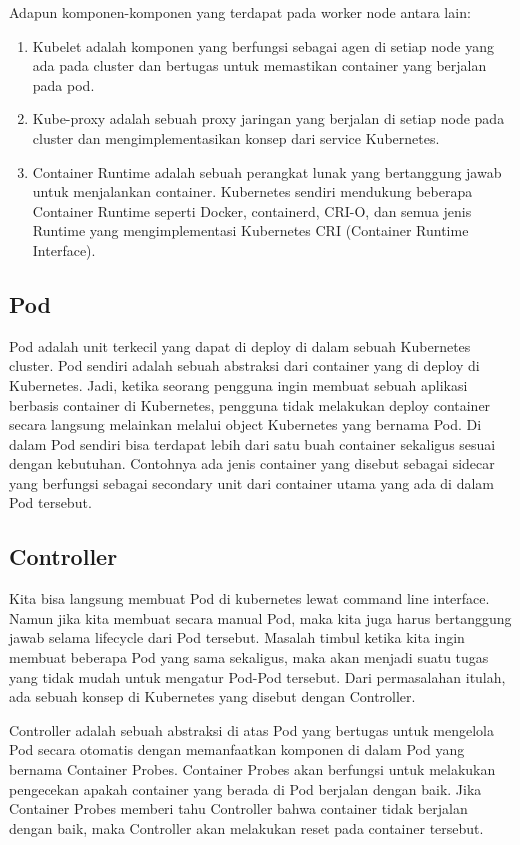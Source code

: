 Adapun komponen-komponen yang terdapat pada worker node antara lain:
\begin{enumerate}
      \item  Kubelet adalah komponen yang berfungsi sebagai agen di setiap node yang ada pada cluster dan bertugas untuk memastikan container yang berjalan pada pod.
      \item Kube-proxy adalah sebuah proxy jaringan yang berjalan di setiap node pada cluster dan mengimplementasikan konsep dari service Kubernetes.
      \item Container Runtime adalah sebuah perangkat lunak yang bertanggung jawab untuk menjalankan container. Kubernetes sendiri mendukung beberapa Container Runtime seperti Docker, containerd, CRI-O, dan semua jenis Runtime yang mengimplementasi Kubernetes CRI (Container Runtime Interface).
\end{enumerate}

\subsection{Pod}
Pod adalah unit terkecil yang dapat di deploy di dalam sebuah Kubernetes cluster.
Pod sendiri adalah sebuah abstraksi dari container yang di deploy di Kubernetes.
Jadi, ketika seorang pengguna ingin membuat sebuah aplikasi berbasis container di Kubernetes, pengguna tidak melakukan deploy container secara langsung melainkan melalui object Kubernetes yang bernama Pod.
Di dalam Pod sendiri bisa terdapat lebih dari satu buah container sekaligus sesuai dengan kebutuhan.
Contohnya ada jenis container yang disebut sebagai sidecar yang berfungsi sebagai secondary unit dari container utama yang ada di dalam Pod tersebut.
\subsection{Controller}
Kita bisa langsung membuat Pod di kubernetes lewat command line interface.
Namun jika kita membuat secara manual Pod, maka kita juga harus bertanggung jawab selama lifecycle dari Pod tersebut.
Masalah timbul ketika kita ingin membuat beberapa Pod yang sama sekaligus, maka akan menjadi suatu tugas yang tidak mudah untuk mengatur Pod-Pod tersebut.
Dari permasalahan itulah, ada sebuah konsep di Kubernetes yang disebut dengan Controller.

Controller adalah sebuah abstraksi di atas Pod yang bertugas untuk mengelola Pod secara otomatis dengan memanfaatkan komponen di dalam Pod yang bernama Container Probes.
Container Probes akan berfungsi untuk melakukan pengecekan apakah container yang berada di Pod berjalan dengan baik.
Jika Container Probes memberi tahu Controller bahwa container tidak berjalan dengan baik, maka Controller akan melakukan reset pada container tersebut.


